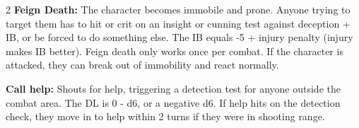 \begin{multicols}{2}
\textbf{Feign Death:} The character becomes immobile and prone. Anyone trying to target them has to hit or crit on an insight or cunning test against deception + IB, or be forced to do something else. The IB equals -5 + injury penalty (injury makes IB better). Feign death only works once per combat. If the character is attacked, they can break out of immobility and react normally.

\textbf{Call help:} Shouts for help, triggering a detection test for anyone outside the combat area. The DL is 0 - d6, or a negative d6. If help hits on the detection check, they move in to help within 2 turns if they were in shooting range.


\end{multicols}